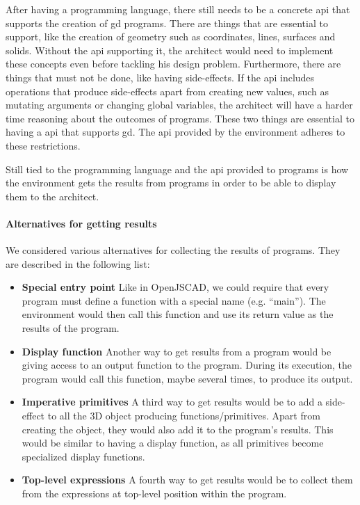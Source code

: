 After having a programming language, there still needs to be a concrete \gls{api} that supports the creation of \gls{gd} programs.
There are things that are essential to support, like the creation of geometry such as coordinates, lines, surfaces and solids.
Without the \gls{api} supporting it, the architect would need to implement these concepts even before tackling his design problem.
Furthermore, there are things that must not be done, like having side-effects.
If the \gls{api} includes operations that produce side-effects apart from creating new values, such as mutating arguments or changing global variables, the architect will have a harder time reasoning about the outcomes of programs.
These two things are essential to having a \gls{api} that supports \gls{gd}.
The \gls{api} provided by the environment adheres to these restrictions.

Still tied to the programming language and the \gls{api} provided to programs is how the environment gets the results from programs in order to be able to display them to the architect.

\paragraph{Alternatives for getting results}
We considered various alternatives for collecting the results of programs.
They are described in the following list:
\begin{itemize}
  \item {\bf Special entry point} Like in OpenJSCAD, we could require that every program must define a function with a special name (e.g. ``main'').
  The environment would then call this function and use its return value as the results of the program.

  \item {\bf Display function} Another way to get results from a program would be giving access to an output function to the program.
  During its execution, the program would call this function, maybe several times, to produce its output.

  \item {\bf Imperative primitives} A third way to get results would be to add a side-effect to all the 3D object producing functions/primitives.
  Apart from creating the object, they would also add it to the program's results.
  This would be similar to having a display function, as all primitives become specialized display functions.

  \item {\bf Top-level expressions} A fourth way to get results would be to collect them from the expressions at top-level position within the program.
\end{itemize}

